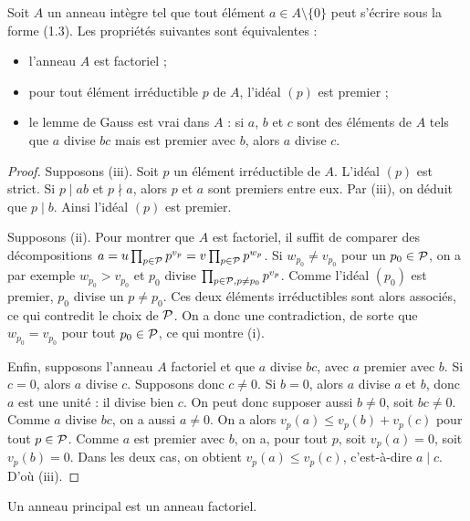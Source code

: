 \documentclass[]{report}
\begin{document}
\begin{prop}{}{}
    Soit $A$ un anneau intègre tel que tout élément $a \in A \setminus \{0\}$ peut s'écrire sous la forme (1.3). Les propriétés suivantes sont équivalentes :
    \begin{itemize}
        \item[(i)] l'anneau $A$ est factoriel ;
        \item[(ii)] pour tout élément irréductible $p$ de $A$, l'idéal $(p)$ est premier ;
        \item[(iii)] le lemme de Gauss est vrai dans $A$ : si $a$, $b$ et $c$ sont des éléments de $A$ tels que $a$ divise $bc$ mais est premier avec $b$, alors $a$ divise $c$.
    \end{itemize}
\end{prop}

\begin{proof}
    Supposons (iii). Soit $p$ un élément irréductible de $A$. L'idéal $(p)$ est strict. Si $p \mid ab$ et $p \nmid a$, alors $p$ et $a$ sont premiers entre eux. Par (iii), on déduit que $p \mid b$. Ainsi l'idéal $(p)$ est premier.

    Supposons (ii). Pour montrer que $A$ est factoriel, il suffit de comparer des décompositions $a = u \prod_{p \in \mathcal{P}} p^{v_p} = v \prod_{p \in \mathcal{P}} p^{w_p}$. Si $w_{p_0} \neq v_{p_0}$ pour un $p_0 \in \mathcal{P}$, on a par exemple $w_{p_0} > v_{p_0}$ et $p_0$ divise $\prod_{p \in \mathcal{P}, p \neq p_0} p^{v_p}$. Comme l'idéal $(p_0)$ est premier, $p_0$ divise un $p \neq p_0$. Ces deux éléments irréductibles sont alors associés, ce qui contredit le choix de $\mathcal{P}$. On a donc une contradiction, de sorte que $w_{p_0} = v_{p_0}$ pour tout $p_0 \in \mathcal{P}$, ce qui montre (i).

    Enfin, supposons l'anneau $A$ factoriel et que $a$ divise $bc$, avec $a$ premier avec $b$. Si $c = 0$, alors $a$ divise $c$. Supposons donc $c \neq 0$. Si $b = 0$, alors $a$ divise $a$ et $b$, donc $a$ est une unité : il divise bien $c$. On peut donc supposer aussi $b \neq 0$, soit $bc \neq 0$. Comme $a$ divise $bc$, on a aussi $a \neq 0$. On a alors $v_p(a) \le v_p(b) + v_p(c)$ pour tout $p \in \mathcal{P}$. Comme $a$ est premier avec $b$, on a, pour tout $p$, soit $v_p(a) = 0$, soit $v_p(b) = 0$. Dans les deux cas, on obtient $v_p(a) \le v_p(c)$, c'est-à-dire $a \mid c$. D'où (iii).
\end{proof}

\begin{tm}{}{}
    Un anneau principal est un anneau factoriel.
\end{tm}
\end{document}

